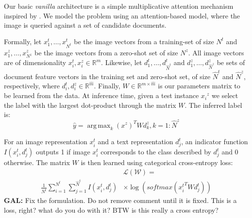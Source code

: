 \documentclass[11pt,a4paper]{article}
\DeclareMathOperator*{\argmax}{arg\,max}
\newcommand\gal[1]{\textcolor{bright}{\textbf{GAL:} #1 }}
\begin{document}
Our basic {\em vanilla} architecture is a simple multiplicative attention mechanism \cite{luong2015effective} inspired by \citet{romera2015embarrassingly}. We model the problem using an attention-based model, where the image is queried
against a set of candidate documents.

Formally, let $x^{t}_1,\ldots,x^{t}_{N^{t}}$ be the image  vectors from a training-set of size   $N^{t}$ and  $x^{z}_1,\ldots,x^{z}_{N^{z}}$ be the image  vectors from  a   zero-shot set of size $N^{z}$. All image vectors are of dimensionality   $x^{t}_i,x^{z}_i\in \mathbb{R}^{m}$.
Likewise, let $d^{t}_1,\ldots,d^{t}_{\hat{N}^{t}}$ and $d^{z}_1,\ldots,d^{z}_{\hat{N}^{z}}$ be sets of  document feature vectors in the  training set and zero-shot set, of size $\hat{N}^{t}$ and  $\hat{N}^{z}$,  respectively, where $d^{t}_i,d^{z}_i\in \mathbb{R}^{\hat{m}}$.
Finally,  \(W\in  \mathbb{R}^{m\times\hat{m}}\) is our parameters matrix to be learned from the data. At inference time, given a test instance ${x_i}^{z}$ we select the label with the largest dot-product through the matrix $W$. The inferred label is:
\begin{equation}
    \label{equation:attention}
    {\hat{y}}=\argmax_{k} \left( x^{z} \right) ^{T}Wd^{z}_{k}, k = 1 : \hat{N}^{z}
\end{equation}

For an image representation $x^{t}_i$ and a text representation $d^{t}_j$, an indicator function $I(x^{t}_i,d^{t}_j)$  outputs 1 if image $x^{t}_i$ corresponds to the class described by $d^{t}_j$ and 0 otherwise.
The matrix $W$ is then learned using categorical cross-entropy loss: 
\begin{equation}
\begin{split}
    &\mathcal{L(W)}= \\
    \frac{1}{N^{t}}\sum_{i=1}^{N^{t}}\sum_{j=1}^{\hat{N}^{t}}I(x^{t}_i,d^{t}_j) 
    &\times\log(\textit{softmax}({x^{t}_i}^TWd^{t}_j))
\end{split}
\end{equation}
\gal{Fix the formulation. Do not remove comment until it is fixed. This is a loss, right? what do you do with it? 
BTW is this really a cross entropy? }

\end{document}
